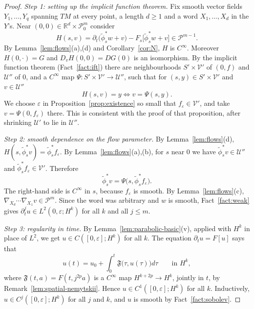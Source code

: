 \documentclass[11pt,reqno]{amsart}
\theoremstyle{definition}
\theoremstyle{remark}
\newcommand{\R}{\mathbb{R}}
\newcommand{\Pp}{\mathcal{P}}
\newcommand{\uses}[1]{}
\numberwithin{equation}{section}
\begin{document}
\begin{proof}
\uses{lem:flows, fact:ift, fact:weak, lem:spatial-nemytskii, cor:N, fact:sobolev, lem:parabolic-basic}
\emph{Step 1: setting up the implicit function theorem.} Fix smooth vector fields $Y_1,\dots,Y_q$
spanning $TM$ at every point, a length $d\ge1$ and a word $X_1,\dots,X_d$ in the $Y$'s. Near
$(0,0)\in\R^d\times\Pp^m_0$ consider
\[
  H(s,v)=\partial_t\bigl(\tilde\phi_s^*w+v\bigr)-F_s\bigl[\tilde\phi_s^*w+v\bigr]\in\Pp^{m-1}.
\]
By Lemma~\ref{lem:flows}(a),(d) and Corollary~\ref{cor:N}, $H$ is $C^\infty$. Moreover $H(0,\cdot)=G$
and $D_vH(0,0)=DG(0)$ is an isomorphism. By the implicit function theorem (Fact~\ref{fact:ift}) there
are neighbourhoods $S'\times\mathcal V'$ of $(0,f)$ and $\mathcal U''$ of $0$, and a $C^\infty$ map
$\Psi\colon S'\times\mathcal V'\to\mathcal U''$, such that for $(s,y)\in S'\times\mathcal V'$ and
$v\in\mathcal U''$
\[
  H(s,v)=y\iff v=\Psi(s,y).
\]
We choose $\varepsilon$ in Proposition~\ref{prop:existence} so small that
$f_\varepsilon\in\mathcal V'$, and take $v=\Psi(0,f_\varepsilon)$ there. This is consistent with the
proof of that proposition, after shrinking $\mathcal U'$ to lie in $\mathcal U''$.

\emph{Step 2: smooth dependence on the flow parameter.} By Lemma~\ref{lem:flows}(d),
$H(s,\tilde\phi_s^*v)=\tilde\phi_s^*f_\varepsilon$. By Lemma~\ref{lem:flows}(a),(b), for $s$ near $0$
we have $\tilde\phi_s^*v\in\mathcal U''$ and $\tilde\phi_s^*f_\varepsilon\in\mathcal V'$. Therefore
\[
  \tilde\phi_s^*v=\Psi\bigl(s,\tilde\phi_s^*f_\varepsilon\bigr).
\]
The right-hand side is $C^\infty$ in $s$, because $f_\varepsilon$ is smooth. By
Lemma~\ref{lem:flows}(c), $\nabla_{X_d}\cdots\nabla_{X_1}v\in\Pp^m$. Since the word was arbitrary and
$w$ is smooth, Fact~\ref{fact:weak} gives $\partial_t^ju\in L^2(0,\varepsilon;H^k)$ for all $k$ and all
$j\le m$.

\emph{Step 3: regularity in time.} By Lemma~\ref{lem:parabolic-basic}(v), applied with $H^k$ in place
of $L^2$, we get $u\in C([0,\varepsilon];H^k)$ for all $k$. The equation $\partial_tu=F[u]$ says that
\[
  u(t)=u_0+\int_0^t\mathfrak F\bigl(\tau,u(\tau)\bigr)d\tau\qquad\text{in }H^k,
\]
where $\mathfrak F(t,a)=F(t,j^{2p}a)$ is a $C^\infty$ map $H^{k+2p}\to H^k$, jointly in $t$, by
Remark~\ref{lem:spatial-nemytskii}. Hence $u\in C^1([0,\varepsilon];H^k)$ for all $k$. Inductively,
$u\in C^j([0,\varepsilon];H^k)$ for all $j$ and $k$, and $u$ is smooth by Fact~\ref{fact:sobolev}.
\end{proof}
\end{document}
